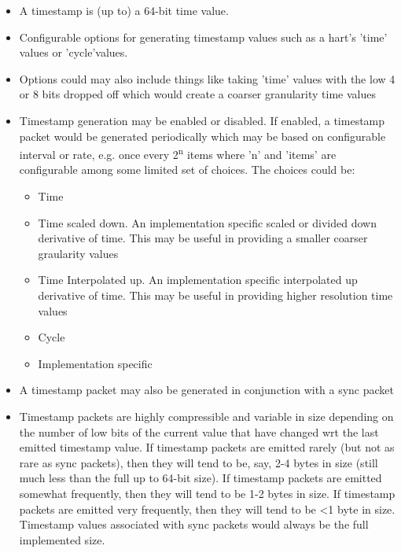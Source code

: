 \begin{itemize}
\item
A timestamp is (up to) a 64-bit time value. 
\item
Configurable options for generating timestamp values such as a hart's 'time' values or 'cycle'values. 
\item
Options could may also include things like taking 'time' values with the low 4 or 8 bits dropped off which would create a coarser granularity time values
\item
Timestamp generation may be enabled or disabled.  If enabled, a
timestamp packet would be generated periodically which may be based on 
configurable interval or rate, e.g. once every 2\textsuperscript{n} items where
'n' and 'items' are configurable among some limited set of
choices. The choices could be:
\begin{itemize}
\item
Time
\item
Time scaled down. An implementation specific scaled or divided down derivative of time. This may be useful in providing a smaller coarser graularity values
\item
Time Interpolated up. An implementation specific interpolated up derivative of time. This may be useful in providing higher resolution time values
\item
Cycle
\item
Implementation specific
\end{itemize}
\item
A timestamp packet may also be generated in conjunction
with a sync packet 
\item
Timestamp packets are highly compressible and variable in size
depending on the number of low bits of the current value that have
changed wrt the last emitted timestamp value.  If timestamp packets
are emitted rarely (but not as rare as sync packets), then they will
tend to be, say, 2-4 bytes in size (still much less than the full up
to 64-bit size).  If timestamp packets are emitted somewhat
frequently, then they will tend to be 1-2 bytes in size.  If timestamp
packets are emitted very frequently, then they will tend to be <1 byte
in size.  Timestamp values associated with sync packets would always
be the full implemented size.
\end{itemize}

